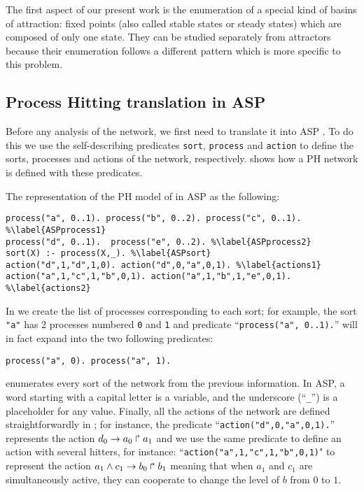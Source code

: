 
The first aspect of our present work is the enumeration of a special kind of basins of attraction: fixed points (also called stable states or steady states) which are composed of only one state.
They can be studied separately from attractors because their enumeration follows a different pattern which is more specific to this problem.

\subsection{Process Hitting translation in ASP}
Before any analysis of the network,
we first need to translate it into ASP \benchmarksfootnote.
To do this we use the self-describing predicates
\texttt{sort}, \texttt{process} and \texttt{action} to define the sorts, processes and actions of the network, respectively.
 shows how a PH network is defined with these predicates.

\begin{example}
\label{ex:asp-ph}
The representation of the PH model of  in ASP as the following:
\begin{lstlisting}
process("a", 0..1). process("b", 0..2). process("c", 0..1). %\label{ASPprocess1}
process("d", 0..1).  process("e", 0..2). %\label{ASPprocess2}
sort(X) :- process(X,_). %\label{ASPsort}
action("d",1,"d",1,0). action("d",0,"a",0,1). %\label{actions1}
action("a",1,"c",1,"b",0,1). action("a",1,"b",1,"e",0,1). %\label{actions2}
\end{lstlisting}
In  we create the list of processes corresponding to each sort;
for example, the sort \texttt{"a"} has 2 processes numbered \texttt{0} and \texttt{1} and
predicate ``\texttt{process("a", 0..1).}'' will in fact expand into the two following predicates:
\begin{lstlisting}[numbers=none]
process("a", 0). process("a", 1).
\end{lstlisting}
 enumerates every sort of the network from the previous information.
In ASP, a word starting with a capital letter is a variable,
and the underscore (``\texttt{\_}'') is a placeholder for any value.
Finally, all the actions of the network are defined straightforwardly in ;
for instance, the predicate ``\texttt{action("d",0,"a",0,1).}'' represents the action
$d_0\rightarrow a_0\Rsh a_1$ and we use the same predicate to define an action with several hitters, for instance: ``\texttt{action("a",1,"c",1,"b",0,1)}" to represent the action $a_1 \wedge c_1\rightarrow b_0\Rsh b_1$ meaning that when $a_1$ and $c_1$ are simultaneously active, they can cooperate to change the level of $b$ from $0$ to $1$.
\end{example}

